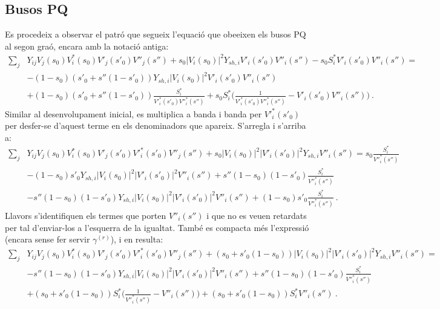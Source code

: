 \subsection{Busos PQ}
Es procedeix a observar el patró que segueix l'equació que obeeixen els busos PQ al segon graó, encara amb la notació antiga:
\begin{equation}
    \begin{split}
        \sum_j&Y_{ij}V_j(s_0)V^*_i(s_0)V'_j(s'_0)V''_j(s'')+s_0|V_i(s_0)|^2Y_{sh,i}V'_i(s'_0)V''_i(s'')-s_0S^*_iV'_i(s'_0)V''_i(s'')=\\
        &-(1-s_0)(s'_0+s''(1-s'_0))Y_{sh,i}|V_i(s_0)|^2V'_i(s'_0)V''_i(s'')\\
        &+(1-s_0)(s'_0+s''(1-s'_0))\frac{S^*_i}{V'^*_i(s'_0)V''^*_i(s'')}+s_0S^*_i\biggl(\frac{1}{V'^*_i(s'_0)V''^*_i(s'')}-V'_i(s'_0)V''_i(s'')\biggr)\ .
    \end{split}
    \label{eq:pw2_pq1}
\end{equation}
Similar al desenvolupament inicial, es multiplica a banda i banda per $V'^*_i(s'_0)$ per desfer-se d'aquest terme en els denominadors que apareix. S'arregla i s'arriba a:
\begin{equation}
    \begin{split}
        \sum_j&Y_{ij}V_j(s_0)V^*_i(s_0)V'_j(s'_0)V'^*_i(s'_0)V''_j(s'')+s_0|V_i(s_0)|^2|V'_i(s'_0)|^2Y_{sh,i}V''_i(s'')=s_0\frac{S^*_i}{V''^*_i(s'')}\\
        &-(1-s_0)s'_0Y_{sh,i}|V_i(s_0)|^2|V'_i(s'_0)|^2V''_i(s'')+s''(1-s_0)(1-s'_0)\frac{S^*_i}{V''^*_i(s'')}\\
        &-s''(1-s_0)(1-s'_0)Y_{sh,i}|V_i(s_0)|^2|V'_i(s'_0)|^2V''_i(s'')+(1-s_0)s'_0\frac{S^*_i}{V''^*_i(s'')}\ .
    \end{split}
    \label{eq:pw2_pq2}
\end{equation}
Llavors s'identifiquen els termes que porten $V''_i(s'')$ i que no es veuen retardats per tal d'enviar-los a l'esquerra de la igualtat. També es compacta més l'expressió (encara sense fer servir $\gamma^{(r)}$), i en resulta:
\begin{equation}
    \begin{split}
        \sum_j&Y_{ij}V_j(s_0)V^*_i(s_0)V'_j(s'_0)V'^*_i(s'_0)V''_j(s'')+(s_0+s'_0(1-s_0))|V_i(s_0)|^2|V'_i(s'_0)|^2Y_{sh,i}V''_i(s'')=\\
        &-s''(1-s_0)(1-s'_0)Y_{sh,i}|V_i(s_0)|^2|V'_i(s'_0)|^2V''_i(s'')+s''(1-s_0)(1-s'_0)\frac{S^*_i}{V''^*_i(s'')}\\
        &+(s_0+s'_0(1-s_0))S^*_i\biggl(\frac{1}{V''^*_i(s'')}-V''_i(s'')\biggr)+(s_0+s'_0(1-s_0))S^*_iV''_i(s'')\ .\\
    \end{split}
    \label{eq:pw2_pq3}
\end{equation}
